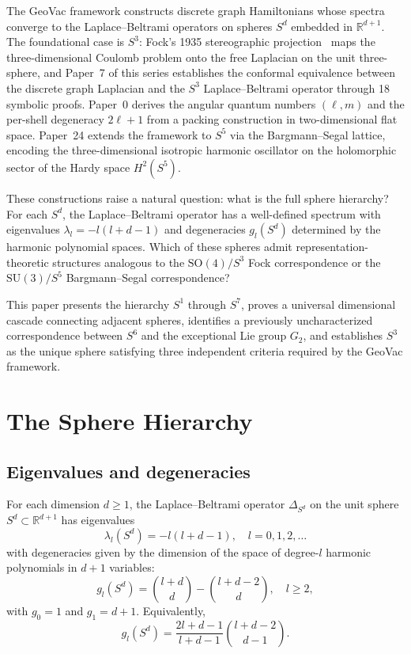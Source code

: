 \documentclass[twocolumn,pra,amsmath,amssymb,superscriptaddress]{revtex4-2}
\begin{document}
The GeoVac framework constructs discrete graph Hamiltonians whose
spectra converge to the Laplace--Beltrami operators on spheres
$S^d$ embedded in $\mathbb{R}^{d+1}$.  The foundational case is
$S^3$: Fock's 1935 stereographic projection~\cite{Fock1935} maps
the three-dimensional Coulomb problem onto the free Laplacian on
the unit three-sphere, and Paper~7 of this series establishes the
conformal equivalence between the discrete graph Laplacian and the
$S^3$ Laplace--Beltrami operator through 18 symbolic proofs.
Paper~0 derives the angular quantum numbers $(\ell, m)$ and the
per-shell degeneracy $2\ell + 1$ from a packing construction in
two-dimensional flat space.  Paper~24 extends the framework to
$S^5$ via the Bargmann--Segal lattice, encoding the
three-dimensional isotropic harmonic oscillator on the holomorphic
sector of the Hardy space $H^2(S^5)$.

These constructions raise a natural question: what is the full
sphere hierarchy?  For each $S^d$, the Laplace--Beltrami operator
has a well-defined spectrum with eigenvalues $\lambda_l = -l(l+d-1)$
and degeneracies $g_l(S^d)$ determined by the harmonic polynomial
spaces.  Which of these spheres admit representation-theoretic
structures analogous to the $\mathrm{SO}(4)/S^3$ Fock
correspondence or the $\mathrm{SU}(3)/S^5$ Bargmann--Segal
correspondence?

This paper presents the hierarchy $S^1$ through $S^7$, proves a
universal dimensional cascade connecting adjacent spheres,
identifies a previously uncharacterized correspondence between
$S^6$ and the exceptional Lie group $G_2$, and establishes $S^3$
as the unique sphere satisfying three independent criteria required
by the GeoVac framework.

\section{The Sphere Hierarchy}
\label{sec:hierarchy}

\subsection{Eigenvalues and degeneracies}

For each dimension $d \geq 1$, the Laplace--Beltrami operator
$\Delta_{S^d}$ on the unit sphere $S^d \subset \mathbb{R}^{d+1}$
has eigenvalues
\begin{equation}
\lambda_l(S^d) = -l(l + d - 1), \quad l = 0, 1, 2, \ldots
\label{eq:eigenvalues}
\end{equation}
with degeneracies given by the dimension of the space of degree-$l$
harmonic polynomials in $d+1$ variables:
\begin{equation}
g_l(S^d) = \binom{l+d}{d} - \binom{l+d-2}{d}, \quad l \geq 2,
\label{eq:degeneracy}
\end{equation}
with $g_0 = 1$ and $g_1 = d+1$.  Equivalently,
\begin{equation}
g_l(S^d) = \frac{2l + d - 1}{l + d - 1}\binom{l + d - 2}{d - 1}.
\label{eq:degeneracy_alt}
\end{equation}
\end{document}
